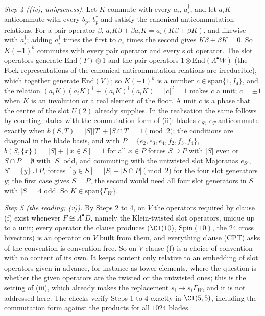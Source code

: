 \emph{Step 4 ((iv), uniqueness).} Let $K$ commute with every $a_{i}$, $a_{i}^{\dagger}$, and let $a_{i}K$ anticommute with every $b_{p}$, $b_{p}^{\dagger}$ and satisfy the canonical anticommutation relations. For a pair operator $\beta$, $a_{i}K\beta + \beta a_{i}K = a_{i}(K\beta + \beta K)$, and likewise with $a_{i}^{\dagger}$; adding $a_{i}^{\dagger}$ times the first to $a_{i}$ times the second gives $K\beta + \beta K = 0$. So $K(-1)^{k}$ commutes with every pair operator and every slot operator. The slot operators generate $\mathrm{End}(F) \otimes 1$ and the pair operators $1 \otimes \mathrm{End}(\Lambda^{\bullet}W)$ (the Fock representations of the canonical anticommutation relations are irreducible), which together generate $\mathrm{End}(V)$; so $K(-1)^{k}$ is a number $c \in \mathrm{span}\{1, I_{4}\}$, and the relation $(a_{i}K)(a_{i}K)^{\dagger} + (a_{i}K)^{\dagger}(a_{i}K) = |c|^{2} = 1$ makes $c$ a unit; $c = \pm 1$ when $K$ is an involution or a real element of the floor. A unit $c$ is a phase that the centre of the slot $U(2)$ already supplies. In the realisation the same follows by counting blades with the commutation form of (ii): blades $e_{S}$, $e_{T}$ anticommute exactly when $b(S, T) = |S||T| + |S \cap T| = 1 \pmod 2$; the conditions are diagonal in the blade basis, and with $P = \{e_{2}, e_{3}, e_{4}, f_{2}, f_{3}, f_{4}\}$, $b(S, \{x\}) = |S| + [x \in S] = 1$ for all $x \in P$ forces $S \supseteq P$ with $|S|$ even or $S \cap P = \emptyset$ with $|S|$ odd, and commuting with the untwisted slot Majoranas $e_{S'}$, $S' = \{y\} \cup P$, forces $[y \in S] = |S| + |S \cap P| \pmod 2$ for the four slot generators $y$; the first case gives $S = P$, the second would need all four slot generators in $S$ with $|S| = 4$ odd. So $K \in \mathrm{span}\{\Gamma_{W}\}$.

\emph{Step 5 (the reading; (v)).} By Steps 2 to 4, on $V$ the operators required by clause (f) exist whenever $F \cong \Lambda^{\bullet}D$, namely the Klein-twisted slot operators, unique up to a unit; every operator the clause produces ($\Cl(10)$, $\mathrm{Spin}(10)$, the $24$ cross bivectors) is an operator on $V$ built from them, and everything clause (CPT) asks of the convention is convention-free. So on $V$ clause (f) is a choice of convention with no content of its own. It keeps content only relative to an embedding of slot operators given in advance, for instance as tower elements, where the question is whether the given operators are the twisted or the untwisted ones; this is the setting of (iii), which already makes the replacement $s_{i} \mapsto s_{i}\Gamma_{W}$, and it is not addressed here. The checks verify Steps 1 to 4 exactly in $\Cl(5,5)$, including the commutation form against the products for all $1024$ blades.
